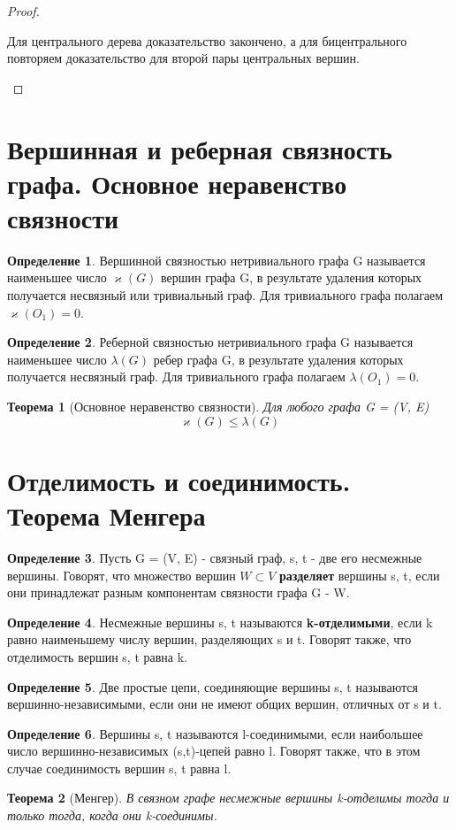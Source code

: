 \documentclass[a4paper]{article}
\newtheorem{theorem}{Теорема}[section]
\theoremstyle{definition}
\newtheorem*{definition}{Определение}
\theoremstyle{remark}
\begin{document}
\begin{multicols*}{2}
\begin{proof}
\begin{itemize}
            Для центрального дерева доказательство закончено, а для бицентрального повторяем доказательство для второй пары центральных
            вершин. 
        \end{itemize}
    \end{proof}
    \section{Вершинная и реберная связность графа. Основное неравенство связности}
    \begin{definition}
        Вершинной связностью нетривиального графа G называется наименьшее число $\varkappa(G)$ вершин графа G, в результате удаления которых получается несвязный или тривиальный граф. Для тривиального графа полагаем $\varkappa(O_1) = 0$.
    \end{definition}
    \begin{definition}
        Реберной связностью нетривиального графа G называется наименьшее число $\lambda(G)$ ребер графа G, в результате удаления которых получается несвязный граф. Для тривиального графа полагаем $\lambda(O_1) = 0$.
    \end{definition}
    \begin{theorem}[Основное неравенство связности]
        Для любого графа G = (V, E) $$\varkappa(G) \leq \lambda(G)$$
    \end{theorem}
    \section{Отделимость и соединимость. Теорема Менгера}
    \begin{definition}
        Пусть G = (V, E) - связный граф, s, t - две его несмежные вершины. Говорят, что множество вершин $W \subset V$ \textbf{разделяет} вершины s, t, если они принадлежат разным компонентам связности графа G - W.
    \end{definition}
    \begin{definition}
        Несмежные вершины s, t называются \textbf{k-отделимыми}, если k равно наименьшему числу вершин, разделяющих s и t. Говорят также, что отделимость вершин s, t равна k.
    \end{definition}
    \begin{definition}
        Две простые цепи, соединяющие вершины s, t называются вершинно-независимыми, если они не имеют общих вершин, отличных от s и t.
    \end{definition}
    \begin{definition}
        Вершины s, t называются l-соединимыми, если наибольшее число вершинно-независимых (s,t)-цепей равно l. Говорят также, что в этом случае соединимость вершин s, t равна l.
    \end{definition}
    \begin{theorem}[Менгер]
        В связном графе несмежные вершины k-отделимы тогда и только тогда, когда они k-соединимы.
    \end{theorem}

\end{multicols*}
\end{document}
